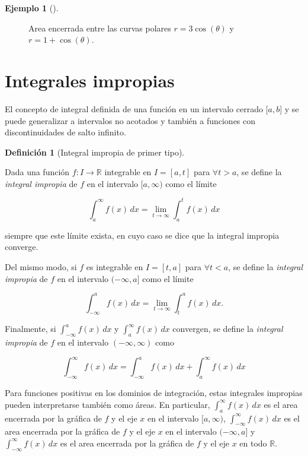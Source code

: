 \documentclass[
  a4paper,
]{scrreport}
\theoremstyle{definition}
\newtheorem{example}{Ejemplo}[chapter]
\theoremstyle{plain}
\theoremstyle{definition}
\newtheorem{definition}{Definición}[chapter]
\theoremstyle{definition}
\theoremstyle{plain}
\theoremstyle{plain}
\theoremstyle{remark}
\begin{document}
\begin{example}[]
\begin{figure}[H]
{}

\caption{Area encerrada entre las curvas polares \(r=3\cos(\theta)\) y
\(r=1+\cos(\theta)\).}

\end{figure}%

\end{example}

\section{Integrales impropias}\label{integrales-impropias}

El concepto de integral definida de una función en un intervalo cerrado
\([a,b\){]} y se puede generalizar a intervalos no acotados y también a
funciones con discontinuidades de salto infinito.

\begin{definition}[Integral impropia de primer
tipo]\protect\hypertarget{def-integral-impropia-1}{}\label{def-integral-impropia-1}

Dada una función \(f:I\to\mathbb{R}\) integrable en \(I=[a,t]\) para
\(\forall t>a\), se define la \emph{integral impropia} de \(f\) en el
intervalo \([a,\infty)\) como el límite

\[
\int_a^\infty f(x)\,dx = \lim_{t\to\infty} \int_a^t f(x)\,dx
\]

siempre que este límite exista, en cuyo caso se dice que la integral
impropia converge.

Del mismo modo, si \(f\) es integrable en \(I=[t,a]\) para
\(\forall t<a\), se define la \emph{integral impropia} de \(f\) en el
intervalo \((-\infty, a]\) como el límite

\[
\int_{-\infty}^a f(x)\,dx = \lim_{t\to\infty} \int_t^a f(x)\,dx.
\]

Finalmente, si \(\int_{-\infty}^a f(x)\,dx\) y
\(\int_a^\infty f(x)\,dx\) convergen, se define la \emph{integral
impropia} de \(f\) en el intervalo \((-\infty, \infty)\) como

\[
\int_{-\infty}^\infty f(x)\,dx = \int_{-\infty}^a f(x)\,dx + \int_a^\infty f(x)\,dx
\]

\end{definition}

Para funciones positivas en los dominios de integración, estas
integrales impropias pueden interpretarse también como áreas. En
particular, \(\int_a^\infty f(x)\,dx\) es el area encerrada por la
gráfica de \(f\) y el eje \(x\) en el intervalo \([a,\infty)\),
\(\int_{-\infty}^\infty f(x)\,dx\) es el area encerrada por la gráfica
de \(f\) y el eje \(x\) en el intervalo \((-\infty,a]\) y
\(\int_{-\infty}^\infty f(x)\,dx\) es el area encerrada por la gráfica
de \(f\) y el eje \(x\) en todo \(\mathbb{R}\).
\end{document}
